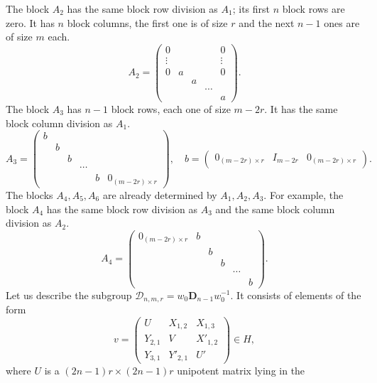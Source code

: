 \documentclass[12pts]{amsart}
\begin{document}
The block $A_2$ has the same block row division as $A_1$; its first
$n$ block rows are zero. It has $n$ block columns, the first one is
of size $r$ and the next $n-1$ ones are of size $m$ each.
\begin{equation}\label{6.3'}
A_2=\begin{pmatrix}0&&&&0\\ \vdots
&&&&\vdots\\0&a&&&0\\&&a\\&&&\cdots
\\&&&&a\end{pmatrix}.
\end{equation}
The block $A_3$ has $n-1$ block rows, each one of size $m-2r$. It has the same block column division as $A_1$.
\begin{equation}\label{6.3''}
A_3=\begin{pmatrix} b\\&b\\&&b\\&&&\cdots\\&&&&b&0_{(m-2r)\times r}\end{pmatrix},
\quad b=\begin{pmatrix}0_{(m-2r)\times r}&I_{m-2r}&0_{(m-2r)\times r}\end{pmatrix}.
\end{equation}
The blocks $A_4, A_5, A_6$ are already determined by $A_1, A_2, A_3$. For example, the block $A_4$ has the same block row division as $A_3$ and the same block column division as $A_2$.
\begin{equation}\label{6.3'''}
A_4=\begin{pmatrix}0_{(m-2r)\times r}& b\\&&b\\&&&b\\&&&&\cdots\\&&&&&b\end{pmatrix}.
\end{equation}
Let us describe the subgroup
$\mathcal{D}_{n,m,r}=w_0\mathbf{D}_{n-1}w_0^{-1}$. It consists
of elements of the form
\begin{equation}\label{6.3}
v=\begin{pmatrix}U&X_{1,2}&X_{1,3}\\Y_{2,1}&V&X'_{1,2}\\Y_{3,1}&Y'_{2,1}&U'\end{pmatrix}\in
H,
\end{equation}
where $U$ is a $(2n-1)r\times (2n-1)r$ unipotent matrix lying in the
\end{document}
